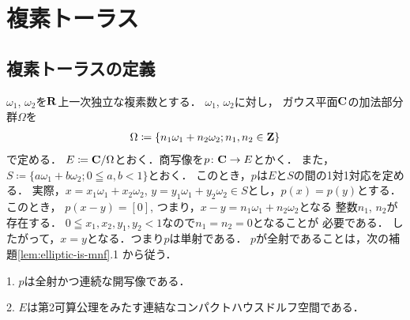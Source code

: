 
\section{複素トーラス}
\subsection{複素トーラスの定義}\label{ssec:torus}
$\omega_1$, $\omega_2$を$\mathbf{R}$上一次独立な複素数とする．
$\omega_1$, $\omega_2$に対し，
ガウス平面$\mathbf{C}$の加法部分群$\Omega$を
\begin{align*}
    \Omega\coloneqq\{n_1\omega_1+n_2\omega_2; n_1, n_2\in\mathbf{Z}\}
\end{align*}
で定める．
$E\coloneqq \mathbf{C}/\Omega$とおく．商写像を$p\colon\mathbf{C}\to E$とかく．
また，$S\coloneqq\{a\omega_1+b\omega_2; 0\leqq a,b<1\}$とおく．
このとき，$p$は$E$と$S$の間の1対1対応を定める．
実際，$x=x_1\omega_1+x_2\omega_2$, 
$y=y_1\omega_1+y_2\omega_2\in S$とし，$p(x)=p(y)$とする．このとき，
$p(x-y)=[0]$, つまり，$x-y=n_1\omega_1+n_2\omega_2$となる
整数$n_1$, $n_2$が存在する．
$0\leqq x_1, x_2, y_1,y_2<1$なので$n_1=n_2=0$となることが
必要である．
したがって，$x=y$となる．つまり$p$は単射である．
$p$が全射であることは，次の補題\ref{lem:elliptic-is-mnf}.1 から従う．

\begin{Lemma}\label{lem:elliptic-is-mnf}
    1. 
    $p$は全射かつ連続な開写像である．

    2. 
    $E$は第2可算公理をみたす連結なコンパクトハウスドルフ空間である．
\end{Lemma}

